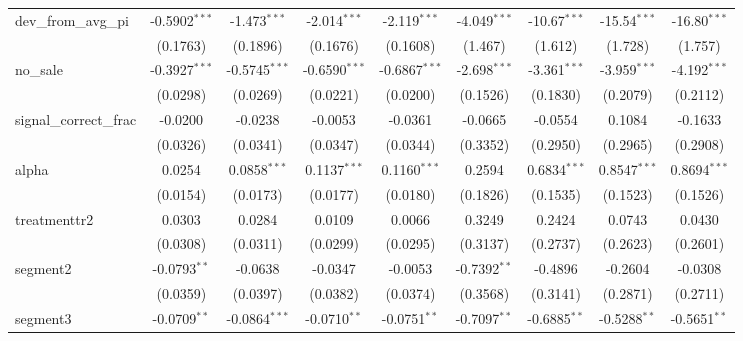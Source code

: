 \begin{tabular}{lcccccccc}
   dev\_from\_avg\_pi               & -0.5902$^{***}$ & -1.473$^{***}$  & -2.014$^{***}$  & -2.119$^{***}$  & -4.049$^{***}$ & -10.67$^{***}$ & -15.54$^{***}$ & -16.80$^{***}$\\   
                                    & (0.1763)        & (0.1896)        & (0.1676)        & (0.1608)        & (1.467)        & (1.612)        & (1.728)        & (1.757)\\   
   no\_sale                         & -0.3927$^{***}$ & -0.5745$^{***}$ & -0.6590$^{***}$ & -0.6867$^{***}$ & -2.698$^{***}$ & -3.361$^{***}$ & -3.959$^{***}$ & -4.192$^{***}$\\   
                                    & (0.0298)        & (0.0269)        & (0.0221)        & (0.0200)        & (0.1526)       & (0.1830)       & (0.2079)       & (0.2112)\\   
   signal\_correct\_frac            & -0.0200         & -0.0238         & -0.0053         & -0.0361         & -0.0665        & -0.0554        & 0.1084         & -0.1633\\   
                                    & (0.0326)        & (0.0341)        & (0.0347)        & (0.0344)        & (0.3352)       & (0.2950)       & (0.2965)       & (0.2908)\\   
   alpha                            & 0.0254          & 0.0858$^{***}$  & 0.1137$^{***}$  & 0.1160$^{***}$  & 0.2594         & 0.6834$^{***}$ & 0.8547$^{***}$ & 0.8694$^{***}$\\   
                                    & (0.0154)        & (0.0173)        & (0.0177)        & (0.0180)        & (0.1826)       & (0.1535)       & (0.1523)       & (0.1526)\\   
   treatmenttr2                     & 0.0303          & 0.0284          & 0.0109          & 0.0066          & 0.3249         & 0.2424         & 0.0743         & 0.0430\\   
                                    & (0.0308)        & (0.0311)        & (0.0299)        & (0.0295)        & (0.3137)       & (0.2737)       & (0.2623)       & (0.2601)\\   
   segment2                         & -0.0793$^{**}$  & -0.0638         & -0.0347         & -0.0053         & -0.7392$^{**}$ & -0.4896        & -0.2604        & -0.0308\\   
                                    & (0.0359)        & (0.0397)        & (0.0382)        & (0.0374)        & (0.3568)       & (0.3141)       & (0.2871)       & (0.2711)\\   
   segment3                         & -0.0709$^{**}$  & -0.0864$^{***}$ & -0.0710$^{**}$  & -0.0751$^{**}$  & -0.7097$^{**}$ & -0.6885$^{**}$ & -0.5288$^{**}$ & -0.5651$^{**}$\\   

\end{tabular}
